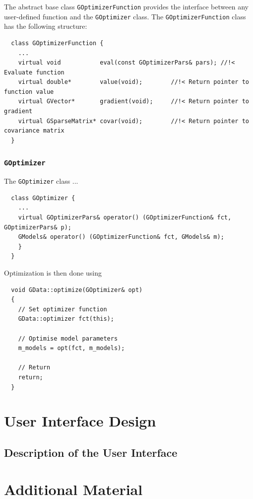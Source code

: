 \documentclass{article}[12pt,a4]
\begin{document}
The abstract base class {\tt GOptimizerFunction} provides the interface between any
user-defined function and the {\tt GOptimizer} class.
The {\tt GOptimizerFunction} class has the following structure:
\begin{verbatim}
  class GOptimizerFunction {
    ...
    virtual void           eval(const GOptimizerPars& pars); //!< Evaluate function
    virtual double*        value(void);        //!< Return pointer to function value
    virtual GVector*       gradient(void);     //!< Return pointer to gradient
    virtual GSparseMatrix* covar(void);        //!< Return pointer to covariance matrix
  }
\end{verbatim}




\subsubsection{{\tt GOptimizer}}

The {\tt GOptimizer} class ...
\begin{verbatim}
  class GOptimizer {
    ...
    virtual GOptimizerPars& operator() (GOptimizerFunction& fct, GOptimizerPars& p);
    GModels& operator() (GOptimizerFunction& fct, GModels& m);
    }
  }
\end{verbatim}

Optimization is then done using

\begin{verbatim}
  void GData::optimize(GOptimizer& opt)
  {
    // Set optimizer function
    GData::optimizer fct(this);

    // Optimise model parameters
    m_models = opt(fct, m_models);

    // Return
    return;
  }
\end{verbatim}



\section{User Interface Design}

\subsection{Description of the User Interface}


\section{Additional Material}
\end{document}
